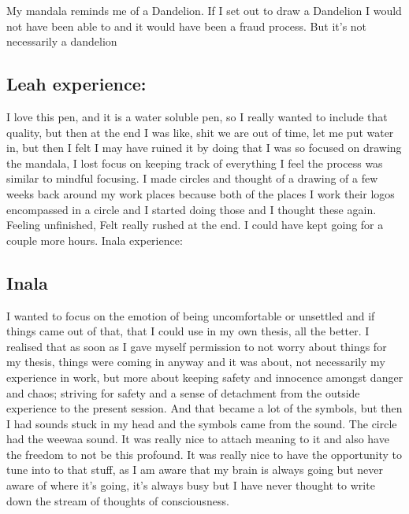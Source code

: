 My mandala reminds me of a Dandelion. If I set out to draw a Dandelion I would not have been able to and it would have been a fraud process. But it's not necessarily a dandelion



\subsection{Leah experience:}

I love this pen, and it is a water soluble pen, so I really wanted to include that quality, but then at the end I was like, shit we are out of time, let me put water in, but then I felt I may have ruined it by doing that
I was so focused on drawing the mandala, I lost focus on keeping track of everything
I feel the process was similar to mindful focusing.
I made circles and thought of a drawing of a few weeks back around my work places because both of the places I work their logos encompassed in a circle and I started doing those and I thought these again.
Feeling unfinished, Felt really rushed at the end. I could have kept going for a couple more hours.
Inala experience:

\subsection{Inala}


I wanted to focus on the emotion of being uncomfortable or unsettled and if things came out of that, that I could use in my own thesis, all the better.
I realised that as soon as I gave myself permission to not worry about things for my thesis, things were coming in anyway and it was about, not necessarily my experience in work, but more about keeping safety and innocence amongst danger and chaos; striving for safety and a sense of detachment from the outside experience to the present session. And that became a lot of the symbols, but then I had sounds stuck in my head and the symbols came from the sound. The circle had the weewaa sound.
It was really nice to attach meaning to it and also have the freedom to not be this profound. It was really nice to have the opportunity to tune into to that stuff, as I am aware that my brain is always going but never aware of where it's going, it's always busy but I have never thought to write down the stream of thoughts of consciousness.

